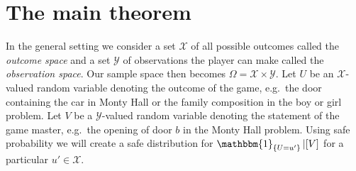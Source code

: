 \documentclass[a4paper]{report}
\theoremstyle{plain}
\theoremstyle{definition}
\theoremstyle{remark}
\numberwithin{equation}{chapter}
\DeclareMathOperator{\1}{\mathbbm{1}}
\newcommand{\X}{\mathcal{X}}
\newcommand{\Y}{\mathcal{Y}}
\begin{document}
\section{The main theorem}\label{sec:DiscMain}
In the general setting we consider a set $\X$ of all possible outcomes called the \emph{outcome space} and a set $\Y$ of observations the player can make called the \emph{observation space}. Our sample space then becomes $\Omega=\X\times\Y$. Let $U$ be an $\X$-valued random variable denoting the outcome of the game, e.g.~the door containing the car in Monty Hall or the family composition in the boy or girl problem. Let $V$ be a $\Y$-valued random variable denoting the statement of the game master, e.g.~the opening of door $b$ in the Monty Hall problem. Using safe probability we will create a safe distribution for $\1_{\{U=u'\}}|[V]$ for a particular $u'\in\X$.
\end{document}
